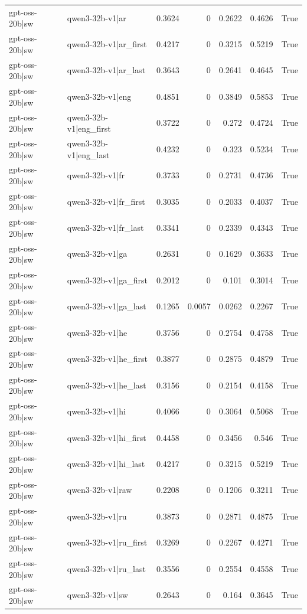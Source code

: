 \begin{table}
\begin{tabular}{l l r r r r l}
gpt-oss-20b|sw & qwen3-32b-v1|ar & 0.3624 & 0 & 0.2622 & 0.4626 & True \\
gpt-oss-20b|sw & qwen3-32b-v1|ar_first & 0.4217 & 0 & 0.3215 & 0.5219 & True \\
gpt-oss-20b|sw & qwen3-32b-v1|ar_last & 0.3643 & 0 & 0.2641 & 0.4645 & True \\
gpt-oss-20b|sw & qwen3-32b-v1|eng & 0.4851 & 0 & 0.3849 & 0.5853 & True \\
gpt-oss-20b|sw & qwen3-32b-v1|eng_first & 0.3722 & 0 & 0.272 & 0.4724 & True \\
gpt-oss-20b|sw & qwen3-32b-v1|eng_last & 0.4232 & 0 & 0.323 & 0.5234 & True \\
gpt-oss-20b|sw & qwen3-32b-v1|fr & 0.3733 & 0 & 0.2731 & 0.4736 & True \\
gpt-oss-20b|sw & qwen3-32b-v1|fr_first & 0.3035 & 0 & 0.2033 & 0.4037 & True \\
gpt-oss-20b|sw & qwen3-32b-v1|fr_last & 0.3341 & 0 & 0.2339 & 0.4343 & True \\
gpt-oss-20b|sw & qwen3-32b-v1|ga & 0.2631 & 0 & 0.1629 & 0.3633 & True \\
gpt-oss-20b|sw & qwen3-32b-v1|ga_first & 0.2012 & 0 & 0.101 & 0.3014 & True \\
gpt-oss-20b|sw & qwen3-32b-v1|ga_last & 0.1265 & 0.0057 & 0.0262 & 0.2267 & True \\
gpt-oss-20b|sw & qwen3-32b-v1|he & 0.3756 & 0 & 0.2754 & 0.4758 & True \\
gpt-oss-20b|sw & qwen3-32b-v1|he_first & 0.3877 & 0 & 0.2875 & 0.4879 & True \\
gpt-oss-20b|sw & qwen3-32b-v1|he_last & 0.3156 & 0 & 0.2154 & 0.4158 & True \\
gpt-oss-20b|sw & qwen3-32b-v1|hi & 0.4066 & 0 & 0.3064 & 0.5068 & True \\
gpt-oss-20b|sw & qwen3-32b-v1|hi_first & 0.4458 & 0 & 0.3456 & 0.546 & True \\
gpt-oss-20b|sw & qwen3-32b-v1|hi_last & 0.4217 & 0 & 0.3215 & 0.5219 & True \\
gpt-oss-20b|sw & qwen3-32b-v1|raw & 0.2208 & 0 & 0.1206 & 0.3211 & True \\
gpt-oss-20b|sw & qwen3-32b-v1|ru & 0.3873 & 0 & 0.2871 & 0.4875 & True \\
gpt-oss-20b|sw & qwen3-32b-v1|ru_first & 0.3269 & 0 & 0.2267 & 0.4271 & True \\
gpt-oss-20b|sw & qwen3-32b-v1|ru_last & 0.3556 & 0 & 0.2554 & 0.4558 & True \\
gpt-oss-20b|sw & qwen3-32b-v1|sw & 0.2643 & 0 & 0.164 & 0.3645 & True \\

\end{tabular}
\end{table}
